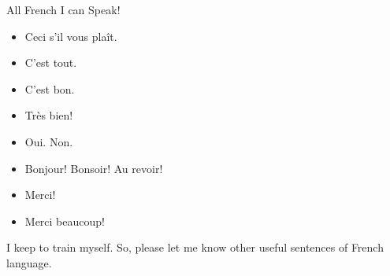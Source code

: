 \documentclass[compress,dvipdfmx,xcolor=table]{beamer}
\begin{document}
\begin{frame}[label={sec:orgheadline5}]{All French I can Speak!}
\begin{itemize}[<+->]
\item Ceci s'il vous plaît.
\item C'est tout.
\item C'est bon.
\item Très bien!
\item Oui. Non.
\item Bonjour! Bonsoir! Au revoir!
\item Merci!
\item Merci beaucoup!
\end{itemize}

\pause
I keep to train myself. So, please let me know other useful sentences
of French language.
\end{frame}
\end{document}
